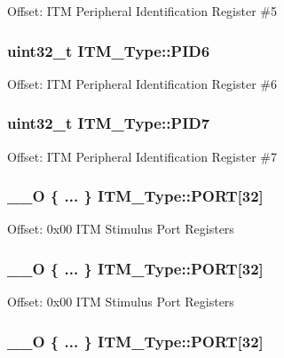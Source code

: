 Offset\-: I\-T\-M Peripheral Identification Register \#5 \hypertarget{struct_i_t_m___type_a755c0ec919e7dbb5f7ff05c8b56a3383}{
\subsubsection[{P\-I\-D6}]{ uint32\-\_\-t I\-T\-M\-\_\-\-Type\-::\-P\-I\-D6}}\label{struct_i_t_m___type_a755c0ec919e7dbb5f7ff05c8b56a3383}
Offset\-: I\-T\-M Peripheral Identification Register \#6 \hypertarget{struct_i_t_m___type_aa31ca6bb4b749201321b23d0dbbe0704}{
\subsubsection[{P\-I\-D7}]{ uint32\-\_\-t I\-T\-M\-\_\-\-Type\-::\-P\-I\-D7}}\label{struct_i_t_m___type_aa31ca6bb4b749201321b23d0dbbe0704}
Offset\-: I\-T\-M Peripheral Identification Register \#7 \hypertarget{struct_i_t_m___type_a39a41c83803bf267d48b8fe6679dc854}{
\subsubsection[{P\-O\-R\-T}]{\setlength{\rightskip}{0pt plus 5cm}\-\_\-\-\_\-\-O \{ ... \}    I\-T\-M\-\_\-\-Type\-::\-P\-O\-R\-T\mbox{[}32\mbox{]}}}\label{struct_i_t_m___type_a39a41c83803bf267d48b8fe6679dc854}
Offset\-: 0x00 I\-T\-M Stimulus Port Registers \hypertarget{struct_i_t_m___type_ac76067077c6828f02f6535b8a77e9f9e}{
\subsubsection[{P\-O\-R\-T}]{\setlength{\rightskip}{0pt plus 5cm}\-\_\-\-\_\-\-O \{ ... \}    I\-T\-M\-\_\-\-Type\-::\-P\-O\-R\-T\mbox{[}32\mbox{]}}}\label{struct_i_t_m___type_ac76067077c6828f02f6535b8a77e9f9e}
Offset\-: 0x00 I\-T\-M Stimulus Port Registers \hypertarget{struct_i_t_m___type_a18cb4840aeebd458cd11021af153c153}{
\subsubsection[{P\-O\-R\-T}]{\setlength{\rightskip}{0pt plus 5cm}\-\_\-\-\_\-\-O \{ ... \}    I\-T\-M\-\_\-\-Type\-::\-P\-O\-R\-T\mbox{[}32\mbox{]}}}\label{struct_i_t_m___type_a18cb4840aeebd458cd11021af153c153}
